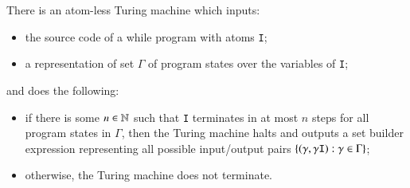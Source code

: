 \begin{lemma}\label{thm:execute-while-programs}
	There is an atom-less Turing machine  which inputs:
	\begin{itemize} 
		\item the source code of a while program  with atoms {\tt I};
		\item a representation of  set $\Gamma$ of program states over the variables of {\tt I};
	\end{itemize}
	and does the following: 
	\begin{itemize}
		\item if there is some $n \in {\mathbb N}$ such that {\tt I} terminates in at most $n$ steps for all program states in $\Gamma$, then the Turing machine halts and outputs a set builder expression representing all possible input/output pairs $
		 	\{ (\gamma, \gamma {\mathtt{I}}) : \gamma \in \Gamma\}$;
 \item otherwise, the Turing machine does not terminate.
	\end{itemize}
\end{lemma}
